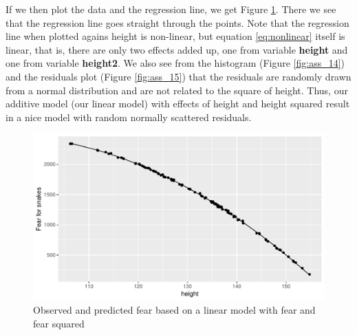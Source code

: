 \documentclass[]{book}\usepackage[]{graphicx}\usepackage[]{color}
\makeatletter
\def\maxwidth{ %
  \ifdim\Gin@nat@width>\linewidth
    \linewidth
  \else
    \Gin@nat@width
  \fi
}
\newenvironment{knitrout}{}{} %
\makeatother
\begin{document}
If we then plot the data and the regression line, we get Figure \ref{fig:ass_13}. There we see that the regression line goes straight through the points. Note that the regression line when plotted agains height is non-linear, but equation \ref{eq:nonlinear} itself is linear, that is, there are only two effects added up, one from variable \textbf{height} and one from variable \textbf{height2}. We also see from the histogram (Figure \ref{fig:ass_14}) and the residuals plot (Figure \ref{fig:ass_15}) that the residuals are randomly drawn from a normal distribution and are not related to the square of height. Thus, our additive model (our linear model) with effects of height and height squared result in a nice model with random normally scattered residuals. 

\begin{knitrout}
\color{fgcolor}\begin{figure}

{\centering \includegraphics[width=\maxwidth]{figure/ass_13-1} 

}

\caption[Observed and predicted fear based on a linear model with fear and fear squared]{Observed and predicted fear based on a linear model with fear and fear squared}\label{fig:ass_13}
\end{figure}


\end{knitrout}
\end{document}
